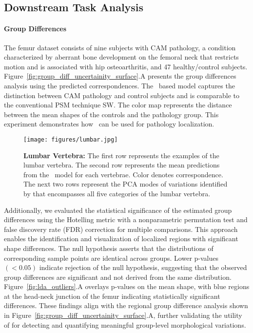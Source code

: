 \subsection{Downstream Task Analysis}
\paragraph{Group Differences}
The femur dataset consists of nine subjects with CAM pathology, a condition characterized by aberrant bone development on the femoral neck that restricts motion and is associated with hip osteoarthritis, and 47 healthy/control subjects. Figure~\ref{fig:group_diff_uncertainity_surface}.A presents the group differences analysis using the predicted correspondences. The \model~based model captures the distinction between CAM pathology and control subjects and is comparable to the conventional PSM technique SW. The color map represents the distance between the mean shapes of the controls and the pathology group. This experiment demonstrates how \model~can be used for pathology localization.
\begin{figure}
    \centering
    \texttt{[image: figures/lumbar.jpg]}
    \caption{\textbf{Lumbar Vertebra: } The first row represents the examples of the lumbar vertebra. The second row represents the mean predictions from the \model~model for each vertebrae. Color denotes correspondence. The next two rows represent the PCA modes of variations identified by \model that encompasses all five categories of the lumbar vertebra.}
    \label{fig:lumbar}
\end{figure}
Additionally, we evaluated the statistical significance of the estimated group differences using the Hotelling metric with a nonparametric permutation test and false discovery rate (FDR) correction \cite{cates2007shape} for multiple comparisons. This approach enables the identification and visualization of localized regions with significant shape differences. The null hypothesis asserts that the distributions of corresponding sample points are identical across groups. Lower p-values \((<0.05)\) indicate rejection of the null hypothesis, suggesting that the observed group differences are significant and not derived from the same distribution. Figure~\ref{fig:lda_outliers}.A overlays p-values on the mean shape, with blue regions at the head-neck junction of the femur indicating statistically significant differences. These findings align with the regional group difference analysis shown in Figure~\ref{fig:group_diff_uncertainity_surface}.A, further validating the utility of \model for detecting and quantifying meaningful group-level morphological variations.

